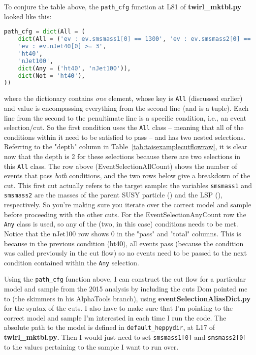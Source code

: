 To conjure the table above, the \texttt{path\_cfg} function at L81 of \textbf{twirl\_mktbl.py} looked like this:

\begin{lstlisting}[belowskip=-0.7cm, language=python, numbers=none]
path_cfg = dict(All = (
	dict(All = ('ev : ev.smsmass1[0] == 1300', 'ev : ev.smsmass2[0] == 1050')),
	'ev : ev.nJet40[0] >= 3',
	'ht40',
	'nJet100',
	dict(Any = ('ht40', 'nJet100')),
	dict(Not = 'ht40'),
))
\end{lstlisting}

where the dictionary contains \emph{one} element, whose key is \texttt{All} (discussed earlier) and value is encompassing everything from the second line (and is a tuple). Each line from the second to the penultimate line is a specific condition, i.e., an event selection/cut. So the first condition uses the \texttt{All} class -- meaning that all of the conditions within it need to be satisfied to pass -- and has two nested selections. Referring to the "depth" column in Table~\ref{tab:taisexamplecutflowraw}, it is clear now that the depth is 2 for these selections because there are two selections in this \texttt{All} class. The row above (EventSelectionAllCount) shows the number of events that pass \emph{both} conditions, and the two rows below give a breakdown of the cut. This first cut actually refers to the target sample: the variables \texttt{smsmass1} and \texttt{smsmass2} are the masses of the parent SUSY particle (\mSUSY) and the LSP (\mLSP), respectively. So you're making sure you iterate over the correct model and sample before proceeding with the other cuts. For the EventSelectionAnyCount row the \texttt{Any} class is used, so any of the (two, in this case) conditions needs to be met. Notice that the nJet100 row shows 0 in the "pass" and "total" columns. This is because in the previous condition (ht40), all events pass (because the condition was called previously in the cut flow) so no events need to be passed to the next condition contained within the \texttt{Any} selection.

Using the \texttt{path\_cfg} function above, I can construct the cut flow for a particular model and sample from the 2015 analysis by including the cuts Dom pointed me to (the skimmers in his AlphaTools branch), using \textbf{eventSelectionAliasDict.py} for the syntax of the cuts. I also have to make sure that I'm pointing to the correct model and sample I'm interested in each time I run the code. The absolute path to the model is defined in \texttt{default\_heppydir}, at L17 of \textbf{twirl\_mktbl.py}. Then I would just need to set \texttt{smsmass1[0]} and \texttt{smsmass2[0]} to the values pertaining to the sample I want to run over.


